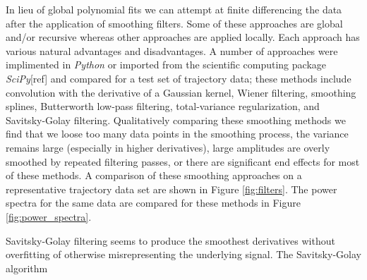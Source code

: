 \documentclass[a4paper, 12pt]{article}
\begin{document}
In lieu of global polynomial fits we can attempt at finite differencing the data after the application of smoothing filters. Some of these approaches are global and/or recursive whereas other approaches are applied locally. Each approach has various natural advantages and disadvantages. A number of approaches were implimented in \emph{Python} or imported from the scientific computing package \emph{SciPy}[ref] and compared for a test set of trajectory data; these methods include convolution with the derivative of a Gaussian kernel, Wiener filtering, smoothing splines, Butterworth low-pass filtering, total-variance regularization, and Savitsky-Golay filtering. Qualitatively comparing these smoothing methods we find that we loose too many data points in the smoothing process, the variance remains large (especially in higher derivatives), large amplitudes are overly smoothed by repeated filtering passes, or there are significant end effects for most of these methods. A comparison of these smoothing approaches on a representative trajectory data set are shown in Figure \ref{fig:filters}. The power spectra for the same data are compared for these methods in Figure \ref{fig:power_spectra}.



Savitsky-Golay filtering seems to produce the smoothest derivatives without overfitting of otherwise misrepresenting the underlying signal. The Savitsky-Golay algorithm
\end{document}
